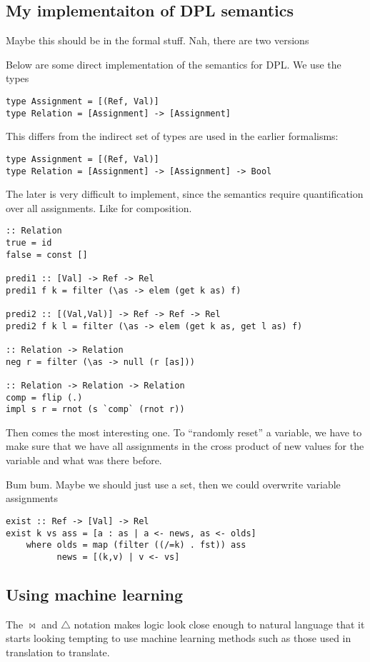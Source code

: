 \documentclass[12pt]{article}
\begin{document}
\subsection{My implementaiton of DPL semantics}
Maybe this should be in the formal stuff. Nah, there are two versions

Below are some direct implementation of the semantics for DPL. We use the types
\begin{lstlisting}
type Assignment = [(Ref, Val)]
type Relation = [Assignment] -> [Assignment]
\end{lstlisting}
This differs from the indirect set of types are used in the earlier formalisms:
\begin{lstlisting}
type Assignment = [(Ref, Val)]
type Relation = [Assignment] -> [Assignment] -> Bool
\end{lstlisting}
The later is very difficult to implement, since the semantics require quantification over all assignments. Like for composition.

\begin{lstlisting}
:: Relation
true = id
false = const []

predi1 :: [Val] -> Ref -> Rel
predi1 f k = filter (\as -> elem (get k as) f)

predi2 :: [(Val,Val)] -> Ref -> Ref -> Rel
predi2 f k l = filter (\as -> elem (get k as, get l as) f)

:: Relation -> Relation
neg r = filter (\as -> null (r [as]))

:: Relation -> Relation -> Relation
comp = flip (.)
impl s r = rnot (s `comp` (rnot r))
\end{lstlisting}
Then comes the most interesting one. To ``randomly reset'' a variable, we have to make sure that we have all assignments in the cross product of new values for the variable and what was there before.

Bum bum. Maybe we should just use a set, then we could overwrite variable assignments
\begin{lstlisting}
exist :: Ref -> [Val] -> Rel
exist k vs ass = [a : as | a <- news, as <- olds]
	where olds = map (filter ((/=k) . fst)) ass
	      news = [(k,v) | v <- vs]
\end{lstlisting}



\subsection{Using machine learning}
The $\bowtie$ and $\triangle$ notation makes logic look close enough to natural language that it starts looking tempting to use machine learning methods such as those used in translation to translate.
\end{document}
